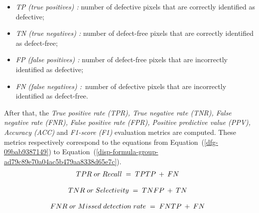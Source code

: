 \documentclass[3p,,preprint,review,12pt]{elsarticle}
\begin{document}
\begin{itemize}
  \item \relax \textit{TP (true positives) :} number of defective pixels that are correctly identified as defective;
  \item \relax \textit{TN (true negatives) :} number of defect-free pixels that are correctly identified as defect-free;
  \item \relax \textit{FP (false positives) :} number of defect-free pixels that are incorrectly identified as defective;~
  \item \relax \textit{\textit{FN (false negatives) :}}~number of defective pixels that are incorrectly identified as defect-free.
\end{itemize}
  After that, the \textit{True positive rate (TPR), True negative rate (TNR), False negative rate (FNR), False positive rate (FPR), Positive predictive value (PPV), Accuracy (ACC) }and \textit{F1-score (F1) }evaluation metrics are computed. These metrics respectively correspond to the equations from Equation~(\ref{dfg-09bab9387149}) to Equation~(\ref{disp-formula-group-ad79c89e70a04ac5b479aa8338d65e7c}).
\let\saveeqnno\theequation
\let\savefrac\frac
\def\dispfrac{\displaystyle\savefrac}
\begin{eqnarray}
\let\frac\dispfrac
\gdef\theequation{15}
\let\theHequation\theequation
\label{dfg-09bab9387149}
\begin{array}{@{}l}TPR\;or\;Recall\;=\;\frac{TP}{TP\:+\:FN}\end{array}
\end{eqnarray}
\global\let\theequation\saveeqnno
\addtocounter{equation}{-1}\ignorespaces 


\let\saveeqnno\theequation
\let\savefrac\frac
\def\dispfrac{\displaystyle\savefrac}
\begin{eqnarray}
\let\frac\dispfrac
\gdef\theequation{16}
\let\theHequation\theequation
\label{dfg-ea7038a4c7c1}
\begin{array}{@{}l}TNR\;or\;Selectivity\;=\;\frac{TN}{FP\:+\:TN}\end{array}
\end{eqnarray}
\global\let\theequation\saveeqnno
\addtocounter{equation}{-1}\ignorespaces 

\let\saveeqnno\theequation
\let\savefrac\frac
\def\dispfrac{\displaystyle\savefrac}
\begin{eqnarray}
\let\frac\dispfrac
\gdef\theequation{17}
\let\theHequation\theequation
\label{dfg-8cc8afe046c8}
\begin{array}{@{}l}FNR\;or\;Missed\;detection\;rate\;=\;\frac{FN}{TP\:+\:FN}\end{array}
\end{eqnarray}
\global\let\theequation\saveeqnno
\addtocounter{equation}{-1}\ignorespaces 
\end{document}
